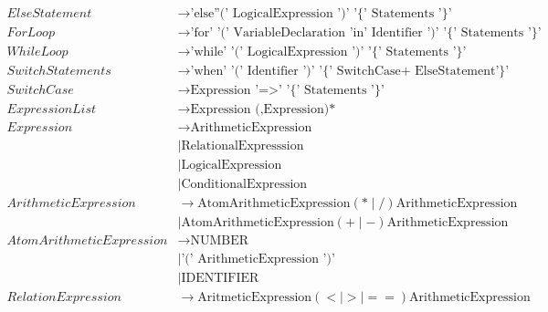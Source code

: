 \begin{align*}
    ElseStatement               & \to \text{'else''(' LogicalExpression ')' '\{' Statements '\}'}                               \\
    ForLoop                     & \to \text{'for' '(' VariableDeclaration 'in' Identifier ')' '\{' Statements '\}'}             \\ 
    WhileLoop                   & \to \text{'while' '(' LogicalExpression ')' '\{' Statements '\}'}                             \\
    SwitchStatements            & \to \text{'when' '(' Identifier ')' '\{' SwitchCase+ ElseStatement'\}'}                       \\
    SwitchCase                  & \to \text{Expression '=>'  '\{' Statements '\}'}                                              \\
    ExpressionList              & \to \text{Expression (,Expression)*}                                                          \\
    Expression                  & \to \text{ArithmeticExpression}                                                               \\
                                & \mid \text{RelationalExpresssion}                                                             \\
                                & \mid \text{LogicalExpression}                                                                 \\
                                & \mid \text{ConditionalExpression}                                                             \\
    ArithmeticExpression        & \to \text{AtomArithmeticExpression} (* \mid /) \text{ArithmeticExpression}                    \\
                                & \mid \text{AtomArithmeticExpression} (+ \mid -) \text{ArithmeticExpression}                   \\
    AtomArithmeticExpression    & \to \text{NUMBER}                                                                             \\
                                & \mid \text{'(' ArithmeticExpression ')'}                                                      \\
                                & \mid \text{IDENTIFIER}                                                                        \\
    RelationExpression          & \to \text{AritmeticExpression} (< \mid > \mid ==) \text{ArithmeticExpression}                 \\

\end{align*}

